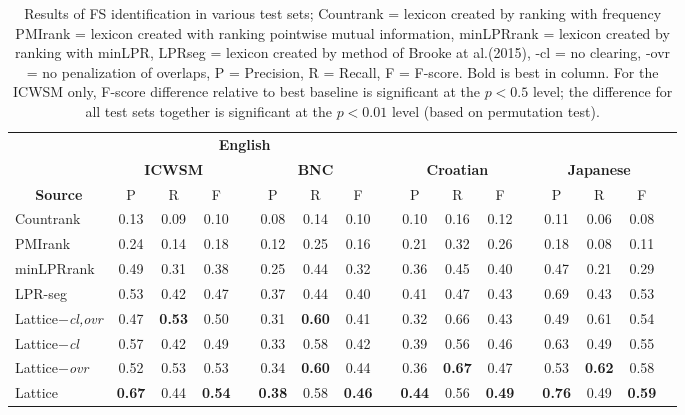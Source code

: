 \documentclass[11pt,letterpaper]{article}
\makeatletter
\def \al {al.\@ }
\makeatother
\begin{document}
 \begin{table}[!bt]
 
 \begin{center}
	 \setlength{\tabcolsep}{5.5pt}
\begin{tabular}{lcccccccccccccccc}

       \toprule
				& \multicolumn{7}{c}{\bf{English}} \\
       \cmidrule(lr){2-8}			
       & \multicolumn{3}{c}{\bf{ICWSM}} & &  \multicolumn{3}{c}{\bf{BNC}} & & \multicolumn{3}{c}{\bf{Croatian}}  && \multicolumn{3}{c}{\bf{Japanese}} \\
       \cmidrule(lr){2-4} \cmidrule(lr){6-8} \cmidrule(lr){10-12} \cmidrule(lr){14-16}
           \multicolumn{1}{c}{\bf{Source}}    & P & R & F &   & P & R & F &   & P & R & F &  & P & R & F \\
          \midrule 
Countrank & 0.13& 0.09 & 0.10 && 0.08 & 0.14 & 0.10 && 0.10 & 0.16 & 0.12 && 0.11 & 0.06 & 0.08 \\
PMIrank & 0.24& 0.14& 0.18 & & 0.12 & 0.25 & 0.16 & & 0.21 &0.32 & 0.26 & & 0.18& 0.08 & 0.11 \\ 
minLPRrank & 0.49& 0.31 & 0.38 & & 0.25& 0.44 & 0.32 & & 0.36 & 0.45 & 0.40 &  & 0.47 & 0.21 & 0.29 \\ 

LPR-seg  &0.53 & 0.42 & 0.47 && 0.37 & 0.44 & 0.40 & & 0.41 & 0.47  & 0.43 &  & 0.69 & 0.43 & 0.53 \\ 
  \midrule

	Lattice\emph{$-$cl,ovr} & 0.47& \bf{0.53} & 0.50 & & 0.31& \bf{0.60} & 0.41 & & 0.32 & 0.66 & 0.43 & & 0.49 & 0.61 & 0.54 \\ 

	Lattice\emph{$-$cl} & 0.57& 0.42 & 0.49 & & 0.33& 0.58 & 0.42 & & 0.39 & 0.56 & 0.46 & & 0.63 & 0.49 & 0.55 \\  	 
			
	Lattice\emph{$-$ovr} & 0.52& 0.53 & 0.53 & & 0.34& \bf{0.60} & 0.44& & 0.36 & \bf{0.67} & 0.47 & & 0.53 & \bf{0.62} & 0.58 \\  
			
				Lattice & \bf{0.67} & 0.44 & \bf{0.54} & & \bf{0.38}& 0.58 & \bf{0.46} & &\bf{0.44} & 0.56 & \bf{0.49} & & \bf{0.76} & 0.49 & \bf{0.59} \\ 
            \bottomrule

 \end{tabular}
 \caption{ Results of FS identification in various test sets; Countrank = lexicon created by ranking with frequency PMIrank = lexicon created with ranking pointwise mutual information, minLPRrank = lexicon created by ranking with minLPR, LPRseg = lexicon created by method of Brooke at \al (2015), -cl = no clearing, -ovr = no penalization of overlaps, P = Precision, R = Recall, F = F-score. Bold is best in column. For the ICWSM only, F-score difference relative to best baseline is significant at the $p < 0.5$ level; the difference for all test sets together is significant at the $ p < 0.01$ level (based on permutation test).}
	 \label{tab:main}

 \end{center}


 \end{table}
\end{document}
